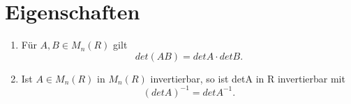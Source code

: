 \section{Eigenschaften}

\begin{enumerate}[label=(\alph*)]
\item Für $A,B \in M_{n}(R)$ gilt \newline
\newline
\[
    det(AB) = detA \cdot detB.
\]
\item Ist $A \in M_n(R)$  in  $M_n(R)$ invertierbar, so ist detA in R invertierbar mit \newline
\newline
\[
    (detA)^{-1} = detA^{-1}.
\]
\end{enumerate}